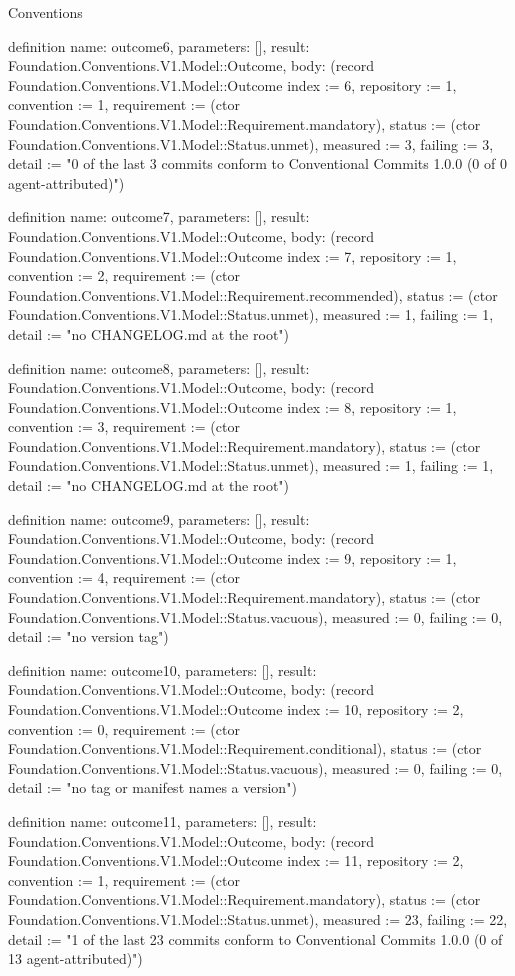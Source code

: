 \begin{lexlean}{Conventions}
\begin{semanticmodule}
definition{
  name: outcome6,
  parameters: [],
  result: Foundation.Conventions.V1.Model::Outcome,
  body: (record Foundation.Conventions.V1.Model::Outcome {index := 6, repository := 1, convention := 1, requirement := (ctor Foundation.Conventions.V1.Model::Requirement.mandatory), status := (ctor Foundation.Conventions.V1.Model::Status.unmet), measured := 3, failing := 3, detail := "0 of the last 3 commits conform to Conventional Commits 1.0.0 (0 of 0 agent-attributed)"})
}

definition{
  name: outcome7,
  parameters: [],
  result: Foundation.Conventions.V1.Model::Outcome,
  body: (record Foundation.Conventions.V1.Model::Outcome {index := 7, repository := 1, convention := 2, requirement := (ctor Foundation.Conventions.V1.Model::Requirement.recommended), status := (ctor Foundation.Conventions.V1.Model::Status.unmet), measured := 1, failing := 1, detail := "no CHANGELOG.md at the root"})
}

definition{
  name: outcome8,
  parameters: [],
  result: Foundation.Conventions.V1.Model::Outcome,
  body: (record Foundation.Conventions.V1.Model::Outcome {index := 8, repository := 1, convention := 3, requirement := (ctor Foundation.Conventions.V1.Model::Requirement.mandatory), status := (ctor Foundation.Conventions.V1.Model::Status.unmet), measured := 1, failing := 1, detail := "no CHANGELOG.md at the root"})
}

definition{
  name: outcome9,
  parameters: [],
  result: Foundation.Conventions.V1.Model::Outcome,
  body: (record Foundation.Conventions.V1.Model::Outcome {index := 9, repository := 1, convention := 4, requirement := (ctor Foundation.Conventions.V1.Model::Requirement.mandatory), status := (ctor Foundation.Conventions.V1.Model::Status.vacuous), measured := 0, failing := 0, detail := "no version tag"})
}

definition{
  name: outcome10,
  parameters: [],
  result: Foundation.Conventions.V1.Model::Outcome,
  body: (record Foundation.Conventions.V1.Model::Outcome {index := 10, repository := 2, convention := 0, requirement := (ctor Foundation.Conventions.V1.Model::Requirement.conditional), status := (ctor Foundation.Conventions.V1.Model::Status.vacuous), measured := 0, failing := 0, detail := "no tag or manifest names a version"})
}

definition{
  name: outcome11,
  parameters: [],
  result: Foundation.Conventions.V1.Model::Outcome,
  body: (record Foundation.Conventions.V1.Model::Outcome {index := 11, repository := 2, convention := 1, requirement := (ctor Foundation.Conventions.V1.Model::Requirement.mandatory), status := (ctor Foundation.Conventions.V1.Model::Status.unmet), measured := 23, failing := 22, detail := "1 of the last 23 commits conform to Conventional Commits 1.0.0 (0 of 13 agent-attributed)"})
}


\end{semanticmodule}
\end{lexlean}
